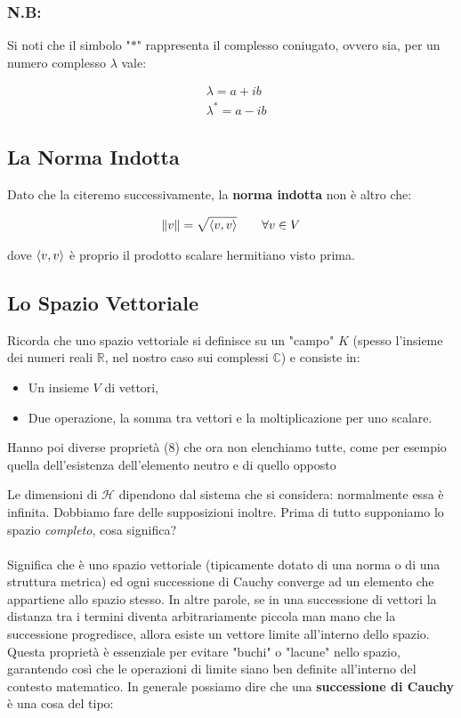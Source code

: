 \subsubsection{N.B:}

	Si noti che il simbolo "$*$" rappresenta il complesso coniugato, ovvero sia, per un numero complesso $\lambda$ vale:
	
\begin{align*}
	&\lambda = a + ib \\
	&\lambda^* = a - ib
\end{align*}

\subsection{La Norma Indotta}
	
	Dato che la citeremo successivamente, la \textbf{norma indotta} non è altro che:

\begin{align*}
	\| v \| = \sqrt{\langle v, v \rangle}  \qquad \forall v \in V
\end{align*}	

	dove $\langle v, v \rangle$ è proprio il prodotto scalare hermitiano visto prima.
	
\subsection{Lo Spazio Vettoriale}

\begin{myapprf}
	Ricorda che uno spazio vettoriale si definisce su un "campo" $K$ (spesso l'insieme dei numeri reali $\mathbb{R}$, nel nostro caso sui complessi $\mathbb{C}$) e consiste in:
	
	\begin{itemize}
		\item Un insieme $V$ di vettori, 
		\item Due operazione, la somma tra vettori e la moltiplicazione per uno scalare.
	\end{itemize}
	
	Hanno poi diverse proprietà ($8$) che ora non elenchiamo tutte, come per esempio quella dell'esistenza dell'elemento neutro e di quello opposto 
\end{myapprf}

	
	Le dimensioni di $\mathcal{H}$ dipendono dal sistema che si considera: normalmente essa è infinita. Dobbiamo fare delle supposizioni inoltre. Prima di tutto supponiamo lo spazio \textit{completo}, cosa significa?
	\\
	\\
	Significa che è uno spazio vettoriale (tipicamente dotato di una norma o di una struttura metrica) ed ogni successione di Cauchy converge ad un elemento che appartiene allo spazio stesso. In altre parole, se in una successione di vettori la distanza tra i termini diventa arbitrariamente piccola man mano che la successione progredisce, allora esiste un vettore limite all'interno dello spazio. Questa proprietà è essenziale per evitare "buchi" o "lacune" nello spazio, garantendo così che le operazioni di limite siano ben definite all'interno del contesto matematico. In generale possiamo dire che una \textbf{successione di Cauchy} è una cosa del tipo:
	
